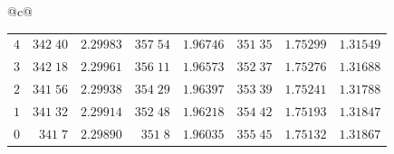 \begin{center}
{\begin{tabular}{@{}c@{}}
\begin{tabular}{r|r|r|r|r|r|r|r}
$4$&$342\;40$&$2.29983$&$357\;54$&$1.96746$&$351\;35$&$1.75299$&$1.31549$\\
$3$&$342\;18$&$2.29961$&$356\;11$&$1.96573$&$352\;37$&$1.75276$&$1.31688$\\
$2$&$341\;56$&$2.29938$&$354\;29$&$1.96397$&$353\;39$&$1.75241$&$1.31788$\\
$1$&$341\;32$&$2.29914$&$352\;48$&$1.96218$&$354\;42$&$1.75193$&$1.31847$\\[2pt]
$0$&$341\;7$&$2.29890$&$351\;8$&$1.96035$&$355\;45$&$1.75132$&$1.31867$\\
\end{tabular}
\end{tabular}%
}
\end{center}
\endgroup
\clearpage
{}
\begingroup
\fontsize{9}{10.2}\selectfont
\setlength{\tabcolsep}{1.5pt}
\renewcommand{\arraystretch}{1.02}
